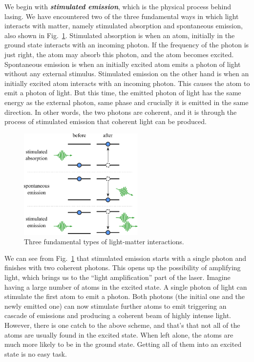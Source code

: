 We begin with \textit{\textbf{stimulated emission}}, which is the physical process behind lasing.
We have encountered two of the three fundamental ways in which light interacts with matter, namely stimulated absorption and spontaneous emission, also shown in Fig.~\ref{fig:5-3_light_matter_interaction}.
Stimulated absorption is when an atom, initially in the ground state interacts with an incoming photon. If the frequency of the photon is just right, the atom may absorb this photon, and the atom becomes excited.
Spontaneous emission is when an initially excited atom emits a photon of light without any external stimulus.
Stimulated emission on the other hand is when an initially excited atom interacts with an incoming photon.
This causes the atom to emit a photon of light.
But this time, the emitted photon of light has the same energy as the external photon, same phase and crucially it is emitted in the same direction.
In other words, the two photons are coherent, and it is through the process of stimulated emission that coherent light can be produced.

\begin{figure}[t]
    \centering
    \includegraphics[width=0.55\textwidth]{lesson5/5-3_three_interactions.pdf}
    \caption[Light-matter interactions]{Three fundamental types of light-matter interactions.}
    \label{fig:5-3_light_matter_interaction}
\end{figure}

We can see from Fig.~\ref{fig:5-3_light_matter_interaction} that stimulated emission starts with a single photon and finishes with two coherent photons.
This opens up the possibility of amplifying light, which brings us to the ``light amplification'' part of the laser.
Imagine having a large number of atoms in the excited state.
A single photon of light can stimulate the first atom to emit a photon.
Both photons (the initial one and the newly emitted one) can now stimulate further atoms to emit triggering an cascade of emissions and producing a coherent beam of highly intense light. 
However, there is one catch to the above scheme, and that's that not all of the atoms are usually found in the excited state.
When left alone, the atoms are much more likely to be in the ground state.
Getting all of them into an excited state is no easy task.


